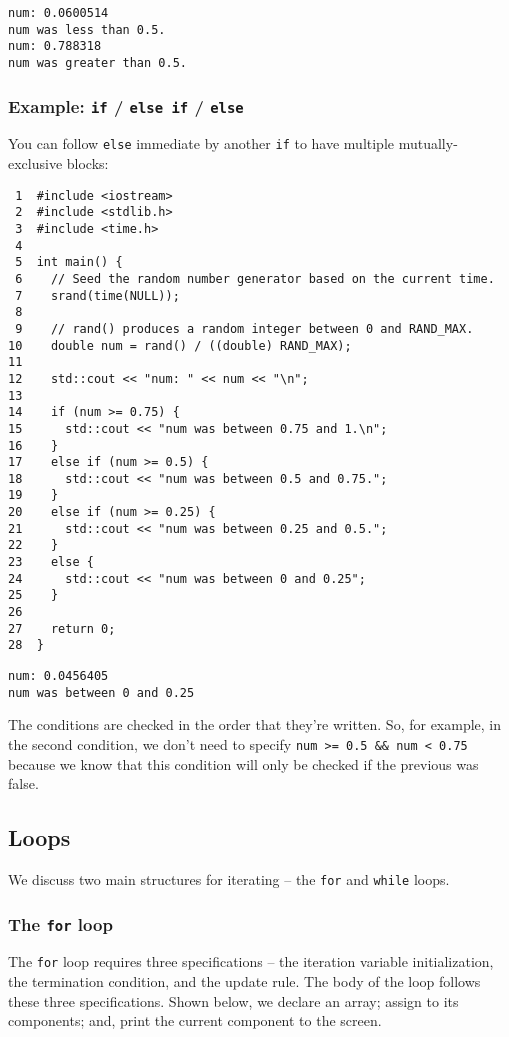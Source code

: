 \documentclass[11pt]{article}
\begin{document}
\begin{verbatim}
num: 0.0600514
num was less than 0.5.
num: 0.788318
num was greater than 0.5.
\end{verbatim}

\subsubsection{Example: \texttt{if} / \texttt{else if} / \texttt{else}}
\label{sec:orgheadline26}

You can follow \texttt{else} immediate by another \texttt{if} to have multiple mutually-
exclusive blocks:

\begin{verbatim}
 1  #include <iostream>
 2  #include <stdlib.h>
 3  #include <time.h>
 4  
 5  int main() {
 6    // Seed the random number generator based on the current time.
 7    srand(time(NULL));
 8  
 9    // rand() produces a random integer between 0 and RAND_MAX.
10    double num = rand() / ((double) RAND_MAX);
11  
12    std::cout << "num: " << num << "\n";
13  
14    if (num >= 0.75) {
15      std::cout << "num was between 0.75 and 1.\n";
16    }
17    else if (num >= 0.5) {
18      std::cout << "num was between 0.5 and 0.75.";
19    }
20    else if (num >= 0.25) {
21      std::cout << "num was between 0.25 and 0.5.";
22    }
23    else {
24      std::cout << "num was between 0 and 0.25";
25    }
26  
27    return 0;
28  }
\end{verbatim}

\begin{verbatim}
num: 0.0456405
num was between 0 and 0.25
\end{verbatim}

The conditions are checked in the order that they're written. So, for example,
in the second condition, we don't need to specify \texttt{num >= 0.5 \&\& num < 0.75} 
because we know that this condition will only be checked if the previous 
was false.

\subsection{Loops}
\label{sec:orgheadline33}
We discuss two main structures for iterating -- the \texttt{for} and \texttt{while} loops.
\subsubsection{The \texttt{for} loop}
\label{sec:orgheadline28}
The \texttt{for} loop requires three specifications -- the iteration variable 
initialization, the termination condition, and the update rule. The body
of the loop follows these three specifications. Shown below, we declare 
an array; assign to its components; and, print the current component to 
the screen.
\end{document}
